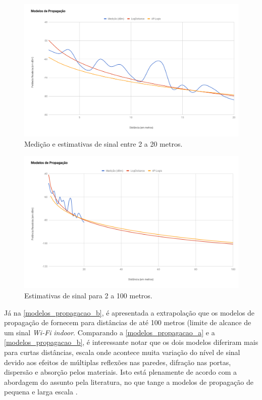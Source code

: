 \documentclass[
	12pt,				%
	twoside,			%
	a4paper,			%
	english,			%
	french,				%
	spanish,			%
	brazil				%
	]{abntex2}
\begin{document}
\begin{figure}[!htb]
    \caption{\label{modelos_propagacao_a} Medição e estimativas de sinal entre 2 a 20 metros.}
    \begin{center}
        \includegraphics[scale=0.4]{imagens/modelos-propagacao_a.png}
    \end{center}
\end{figure}
\begin{figure}[!htb]
    \caption{\label{modelos_propagacao_b} Estimativas de sinal para 2 a 100 metros.}
    \begin{center}
        \includegraphics[scale=0.4]{imagens/modelos-propagacao_b.png}
    \end{center}
\end{figure}

Já na \autoref{modelos_propagacao_b}, é apresentada a extrapolação que
os modelos de propagação de fornecem para distâncias de até 100 metros
(limite de alcance de um sinal \emph{Wi-Fi} \emph{indoor}. Comparando a
\autoref{modelos_propagacao_a} e a \autoref{modelos_propagacao_b}, é
interessante notar que os dois modelos diferiram mais para curtas
distâncias, escala onde acontece muita variação do nível de sinal devido
aos efeitos de múltiplas reflexões nas paredes, difração nas portas,
dispersão e absorção pelos materiais. Isto está plenamente de acordo com
a abordagem do assunto pela literatura, no que tange a modelos de
propagação de pequena e larga escala \cite{RAPPAPORT}.
\end{document}
